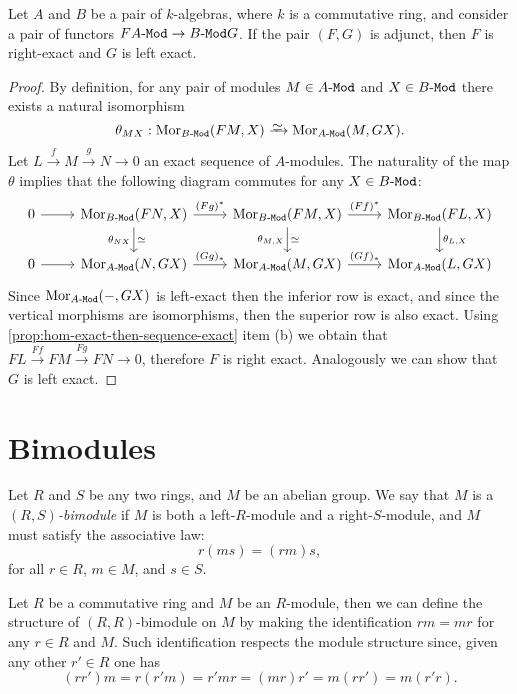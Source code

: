 \begin{theorem}
\label{thm:mod-cat-adjoint-pair-right-left-exact-functors}
Let \(A\) and \(B\) be a pair of \(k\)-algebras, where \(k\) is a commutative
ring, and consider a pair of functors \(F \relax {A\text{-}\texttt{Mod}} \to {B\text{-}\texttt{Mod}} \relax G\). If
the pair \((F, G)\) is adjunct, then \(F\) is right-exact and \(G\) is left
exact.
\end{theorem}

\begin{proof}
By definition, for any pair of modules \(M \in {A\text{-}\texttt{Mod}}\) and \(X \in {B\text{-}\texttt{Mod}}\) there
exists a natural isomorphism
\[
\theta_{M X}: \Mor_{\Mod B}(F M, X) \isoto \Mor_{\Mod A}(M, G X).
\]
Let \(L \xrightarrow{f} M \xrightarrow{g} N \to 0\) an exact sequence of
\(A\)-modules. The naturality of the map \(\theta\) implies that the following
diagram commutes for any \(X \in {B\text{-}\texttt{Mod}}\):
\[
\begin{tikzcd}
0 \ar[r]
&\Mor_{\Mod B}(F N, X) \ar[r, "{(F g)^{*}}"]
\ar[d, "\theta_{N X}"', "\dis"]
&\Mor_{\Mod B}(F M, X) \ar[r, "{(F f)^{*}}"]
\ar[d, "\theta_{M, X}"', "\dis"]
&\Mor_{\Mod B}(F L, X) \ar[d, "\theta_{L, X}"]
\\
0 \ar[r]
&\Mor_{\Mod A}(N, G X) \ar[r, "{(G g)_{*}}"]
&\Mor_{\Mod A}(M, G X) \ar[r, "{(G f)_{*}}"]
&\Mor_{\Mod A}(L, G X)
\end{tikzcd}
\]
Since \(\operatorname{Mor}_{{A\text{-}\texttt{Mod}}}(-, G X)\) is left-exact then the inferior row is exact,
and since the vertical morphisms are isomorphisms, then the superior row is also
exact. Using \cref{prop:hom-exact-then-sequence-exact} item (b) we obtain that
\(F L \xrightarrow{F f} F M \xrightarrow{F g} F N \to 0\), therefore \(F\) is
right exact. Analogously we can show that \(G\) is left exact.
\end{proof}

\section{Bimodules}

\begin{definition}[Bimodule]
\label{def:bimodule}
Let \(R\) and \(S\) be any two rings, and \(M\) be an abelian group. We say that
\(M\) is a \emph{\((R, S)\)-bimodule} if \(M\) is both a left-\(R\)-module and a
right-\(S\)-module, and \(M\) must satisfy the associative law:
\[
r (m s) = (r m) s,
\]
for all \(r \in R\), \(m \in M\), and \(s \in S\).
\end{definition}

\begin{example}
\label{exp:R-commutative-R-R-bimodule}
Let \(R\) be a commutative ring and \(M\) be an \(R\)-module, then we can define
the structure of \((R, R)\)-bimodule on \(M\) by making the identification \(r m
= m r\) for any \(r \in R\) and \(M\). Such identification respects the module
structure since, given any other \(r' \in R\) one has
\[
(r r') m = r (r' m) = r' m r = (m r) r' = m (r r') = m (r' r).
\]
\end{example}

